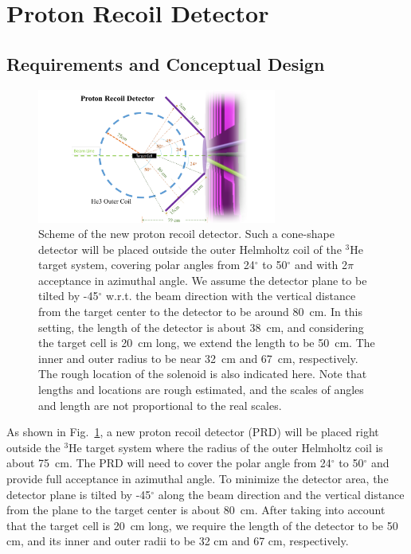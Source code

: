 \section{Proton Recoil Detector}

\subsection{Requirements and Conceptual Design}

\begin{figure}[!ht]
 \begin{center}
  \includegraphics[width=0.7\textwidth]{./figures/prd_solid.pdf}
   \caption[Scheme of the new proton recoil detector ]{\footnotesize{Scheme of
       the new proton recoil detector. Such a cone-shape detector will be
       placed outside the outer Helmholtz coil of the $\mathrm{^{3}He}$ target
       system, covering polar angles from 24$^{\circ}$ to 50$^{\circ}$ and with
       2$\pi$ acceptance in azimuthal angle. We assume the detector plane
       to be tilted by -45$^{\circ}$ w.r.t. the beam direction with the
       vertical distance from the target center to the detector to be around
       80~cm. In this setting, the length of the detector is about 38~cm, and
       considering the target cell is 20~cm long, we extend the length to be
       50~cm. The inner and outer radius to be near 32~cm and 67~cm,
       respectively. The rough location of the solenoid is also indicated here. Note that lengths and locations are rough estimated, and the scales of angles and length are not proportional to the real scales.}}
   \label{prd_concept}
 \end{center}
\end{figure}
As shown in Fig.~\ref{prd_concept}, a new proton recoil detector (PRD) will be
placed right outside the $\mathrm{^{3}He}$ target system where the radius of
the outer Helmholtz coil is about 75~cm. The PRD will need to cover the polar
angle from 24$^{\circ}$ to 50$^{\circ}$ and provide full acceptance in
azimuthal angle. To minimize the detector area, the detector plane is tilted by
-45$^{\circ}$ along the beam direction and the vertical distance from the plane
to the target center is about 80~cm. After taking into account that the target
cell is 20~cm long, we require the length of the detector to be 50 cm, and its
inner and outer radii to be 32 cm and 67 cm, respectively.

